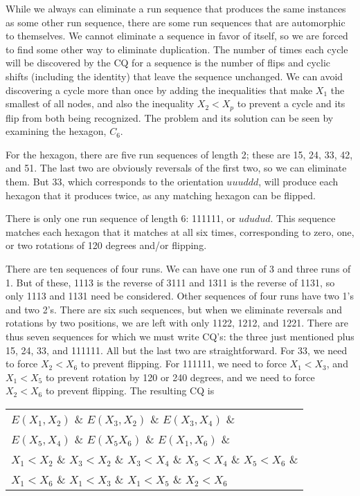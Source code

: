While we always can eliminate a run sequence that produces the same instances as some other run sequence, there are some run sequences that are automorphic to themselves.  We cannot eliminate a sequence in favor of itself, so we are forced to find some other way to eliminate duplication.   The number of times each cycle will be discovered by the CQ for a sequence is the number of flips and cyclic shifts (including the identity) that leave the sequence unchanged.  We can avoid discovering a cycle more than once by adding the inequalities that make $X_1$ the smallest of all nodes, and also the inequality $X_2<X_p$ to prevent a cycle and its flip from both being recognized.  The problem and its solution can be seen by examining the hexagon, $C_6$.

\begin{example}
\label{hex-ex}
For the hexagon, there are five run sequences of length 2; these are 15, 24, 33, 42, and 51.  The last two are obviously reversals of the first two, so we can eliminate them.  But 33, which corresponds to the orientation $uuuddd$, will produce each hexagon that it produces twice, as any matching hexagon can be flipped.

There is only one run sequence of length 6: 111111, or $ududud$.  This sequence matches each hexagon that it matches at all six times, corresponding to zero, one, or two rotations of 120 degrees and/or flipping.

There are ten sequences of four runs.  We can have one run of 3 and three runs of 1.  But of these, 1113 is the reverse of 3111 and 1311 is the reverse of 1131, so only 1113 and 1131 need be considered.   Other sequences of four runs have two 1's and two 2's.  There are six such sequences, but when we eliminate reversals and rotations by two positions, we are left with only 1122, 1212, and 1221.  There are thus seven sequences for which we must write CQ's: the three just mentioned plus 15, 24, 33, and 111111.  All but the last two are straightforward.  For 33, we need to force $X_2<X_6$ to prevent flipping.   For 111111, we need to force $X_1<X_3$, and $X_1<X_5$ to prevent rotation by 120 or 240 degrees, and we need to force $X_2<X_6$ to prevent flipping.  The resulting CQ is

\begin{center}
\begin{tabular}{l}
$E(X_1,X_2)$ \& $E(X_3,X_2)$ \& $E(X_3,X_4)$ \& \\
$E(X_5,X_4)$ \& $E(X_5X_6)$ \& $E(X_1,X_6)$ \& \\
$X_1<X_2$ \& $X_3<X_2$ \& $X_3<X_4$ \& $X_5<X_4$ \& $X_5<X_6$ \& \\
$X_1<X_6$ \& $X_1<X_3$ \& $X_1<X_5$ \& $X_2<X_6$\\
\end{tabular}
\end{center}
\end{example}

